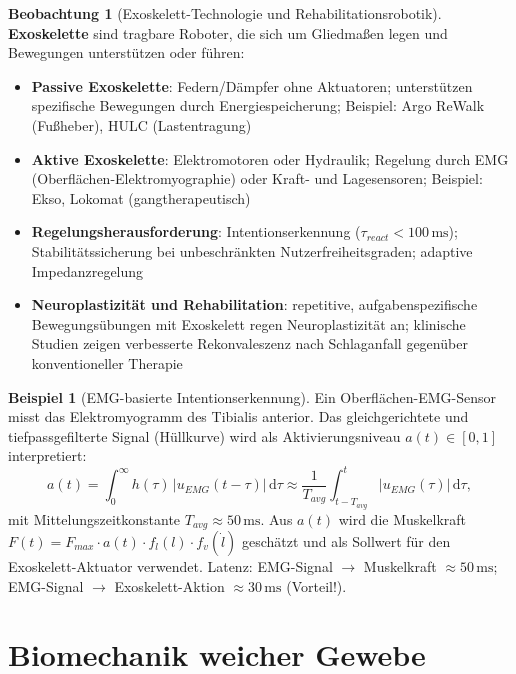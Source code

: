 ﻿\documentclass[a4paper,12pt]{report}
\theoremstyle{definition}
\newtheorem{beispiel}{Beispiel}
\newtheorem{beobachtung}{Beobachtung}
\begin{document}
\begin{beobachtung}[Exoskelett-Technologie und Rehabilitationsrobotik]
\textbf{Exoskelette} sind tragbare Roboter, die sich um Gliedmaßen legen
und Bewegungen unterstützen oder führen:
\begin{itemize}
    \item[-] \textbf{Passive Exoskelette}: Federn/Dämpfer ohne Aktuatoren;
          unterstützen spezifische Bewegungen durch Energiespeicherung;
          Beispiel: Argo ReWalk (Fußheber), HULC (Lastentragung)
    \item[-] \textbf{Aktive Exoskelette}: Elektromotoren oder Hydraulik;
          Regelung durch EMG (Oberflächen-Elektromyographie) oder Kraft-
          und Lagesensoren; Beispiel: Ekso, Lokomat (gangtherapeutisch)
    \item[-] \textbf{Regelungsherausforderung}: Intentionserkennung
          ($\tau_{react} < 100\,\mathrm{ms}$); Stabilitätssicherung bei
          unbeschränkten Nutzerfreiheitsgraden; adaptive Impedanzregelung
    \item[-] \textbf{Neuroplastizität und Rehabilitation}: repetitive,
          aufgabenspezifische Bewegungsübungen mit Exoskelett regen
          Neuroplastizität an; klinische Studien zeigen verbesserte Rekonvaleszenz
          nach Schlaganfall gegenüber konventioneller Therapie
\end{itemize}
\end{beobachtung}

\begin{beispiel}[EMG-basierte Intentionserkennung]
Ein Oberflächen-EMG-Sensor misst das Elektromyogramm des Tibialis anterior.
Das gleichgerichtete und tiefpassgefilterte Signal (Hüllkurve) wird als
Aktivierungsniveau $a(t) \in [0,1]$ interpretiert:
\[
  a(t) = \int_0^\infty h(\tau)\,|u_{EMG}(t-\tau)|\,\mathrm{d}\tau
  \approx \frac{1}{T_{avg}}\int_{t-T_{avg}}^t |u_{EMG}(\tau)|\,\mathrm{d}\tau,
\]
mit Mittelungszeitkonstante $T_{avg} \approx 50\,\mathrm{ms}$.
Aus $a(t)$ wird die Muskelkraft $F(t) = F_{max}\cdot a(t)\cdot f_l(l)\cdot f_v(\dot{l})$
geschätzt und als Sollwert für den Exoskelett-Aktuator verwendet.
Latenz: EMG-Signal $\to$ Muskelkraft $\approx 50\,\mathrm{ms}$;
EMG-Signal $\to$ Exoskelett-Aktion $\approx 30\,\mathrm{ms}$ (Vorteil!).
\end{beispiel}

\section{Biomechanik weicher Gewebe}
\end{document}
